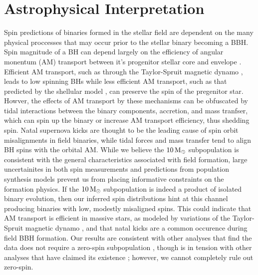 \section{Astrophysical Interpretation} \label{sec:astro}


Spin predictions of binaries formed in the stellar field are dependent on the many physical proccesses that may occur prior to the stellar binary becoming a BBH.  Spin magnitude of a BH can depend largely on the efficiency of angular monentum (AM) transport between it's progenitor stellar core and envelope \citep{2203.02515}. Efficient AM transport, such as through the Taylor-Spruit magnetic dynamo \citep{10.1051/0004-6361:20011465}, leads to low spinning BHs \citep{10.3847/2041-8213/ab339b} while less efficient AM transport, such as that predicted by the shellular model \citep{1992A&A...265..115Z,2012A&A...537A.146E,10.3847/1538-4365/aacb24,2019MNRAS.485.4641C}, can preserve the spin of the pregenitor star. Howver, the effects of AM transport by these mechanisms can be obfuscated by tidal interactions between the binary components, accretion, and mass tranfser, which can spin up the binary or increase AM transport efficiency, thus shedding spin. Natal supernova kicks are thought to be the leading cause of spin orbit misalignments in field binaries, while tidal forces and mass transfer tend to align BH spins with the orbital AM. While we believe the $10{\,\rm M}_\odot$ subpopulation is consistent with the general characteristics associated with field formation, large uncertainites in both spin measurements and predictions from population synthesis models prevent us from placing informative constraints on the formation physics. If the $10{\,\rm M}_\odot$ subpopulation is indeed a product of isolated binary evolution, then our inferred spin distributions hint at this channel producing binaries with low, modestly misaligned spins. This could indicate that AM transport is efficient in massive stars, as modeled by variations of the Taylor-Spruit magnetic dynamo \citep{1706.07053}, and that natal kicks are a common occurence during field BBH formation. Our results are consistent with other analyses that find the data does not require a zero-spin subpopulation \citep{arXiv2205.08574,2301.01312}, though is in tension with other analyses that have claimed its existence \citep{doi.org/10.3847/2041-8213/ac2f3c,2105.10580}; however, we cannot completely rule out zero-spin.

